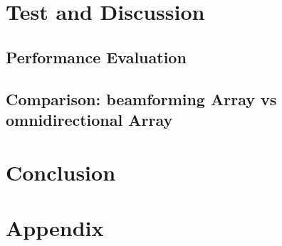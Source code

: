 \part{Test and Discussion}\label{pt:test}
\graphicspath{{figures/tests/}}
	
	\chapter{Performance Evaluation}
		
	\chapter{Comparison: beamforming Array vs omnidirectional Array}
		

 
\part{Conclusion}\label{pt:conclusion}
% 
%

\glsresetall
\appendix %

 \graphicspath{{figures/appendix/}}
\part{Appendix}\label{pt:appendix}














